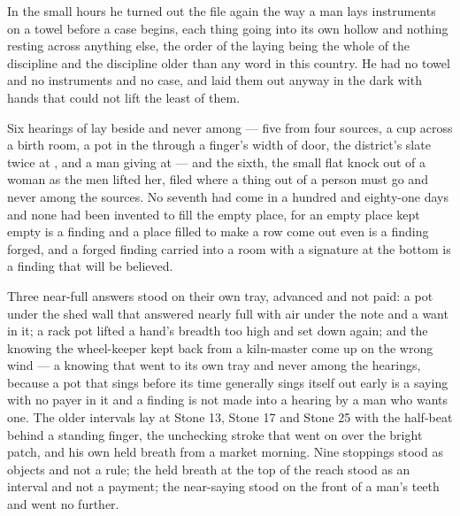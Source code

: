 \scenebreak

In the small hours he turned out the file again the way a man lays instruments on a towel before a case begins, each thing going into its own hollow and nothing resting across anything else, the order of the laying being the whole of the discipline and the discipline older than any word in this country. He had no towel and no instruments and no case, and laid them out anyway in the dark with hands that could not lift the least of them.

Six hearings of  lay beside and never among --- five from four sources, a cup across a birth room, a pot in the  through a finger's width of door, the district's slate twice at , and a man giving at  --- and the sixth, the small flat knock out of a woman as the men lifted her, filed where a thing out of a person must go and never among the sources. No seventh had come in a hundred and eighty-one days and none had been invented to fill the empty place, for an empty place kept empty is a finding and a place filled to make a row come out even is a finding forged, and a forged finding carried into a room with a signature at the bottom is a finding that will be believed.

Three near-full answers stood on their own tray, advanced and not paid: a pot under the shed wall that answered nearly full with air under the note and a want in it; a rack pot lifted a hand's breadth too high and set down again; and the knowing the wheel-keeper kept back from a kiln-master come up on the wrong wind --- a knowing that went to its own tray and never among the hearings, because a pot that sings before its time generally sings itself out early is a saying with no payer in it and a finding is not made into a hearing by a man who wants one. The older intervals lay at Stone 13, Stone 17 and Stone 25 with the half-beat behind a standing finger, the unchecking stroke that went on over the bright patch, and his own held breath from a market morning. Nine stoppings stood as objects and not a rule; the held breath at the top of the reach stood as an interval and not a payment; the near-saying stood on the front of a man's teeth and went no further.

